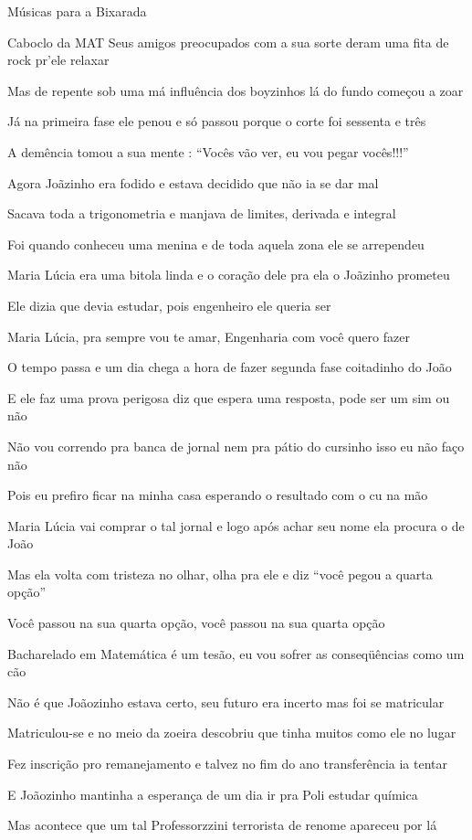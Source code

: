 \begin{secao}{Músicas para a Bixarada}
\begin{subsecao}{Caboclo da MAT}
Seus amigos preocupados com a sua sorte deram uma fita de rock pr'ele relaxar

Mas de repente sob uma má influência dos boyzinhos lá do fundo começou a zoar

Já na primeira fase ele penou e só passou porque o corte foi sessenta e três

A demência tomou a sua mente : ``Vocês vão ver, eu vou pegar vocês!!!''

Agora Joãzinho era fodido e estava decidido que não ia se dar mal

Sacava toda a trigonometria e manjava de limites, derivada e integral

Foi quando conheceu uma menina e de toda aquela zona ele se arrependeu

Maria Lúcia era uma bitola linda e o coração dele pra ela o Joãzinho prometeu

Ele dizia que devia estudar, pois engenheiro ele queria ser

Maria Lúcia, pra sempre vou te amar, Engenharia com você quero fazer

O tempo passa e um dia chega a hora de fazer segunda fase coitadinho do João

E ele faz uma prova perigosa diz que espera uma resposta, pode ser um sim ou não

Não vou correndo pra banca de jornal nem pra pátio do cursinho isso eu não faço
não

Pois eu prefiro ficar na minha casa esperando o resultado com o cu na mão

Maria Lúcia vai comprar o tal jornal e logo após achar seu nome ela procura o de
João

Mas ela volta com tristeza no olhar, olha pra ele e diz ``você pegou a quarta
opção''

Você passou na sua quarta opção, você passou na sua quarta opção

Bacharelado em Matemática é um tesão, eu vou sofrer as conseqüências como um cão

Não é que Joãozinho estava certo, seu futuro era incerto mas foi se matricular

Matriculou-se e no meio da zoeira descobriu que tinha muitos como ele no lugar

Fez inscrição pro remanejamento e talvez no fim do ano transferência ia tentar

E Joãozinho mantinha a esperança de um dia ir pra Poli estudar química

Mas acontece que um tal Professorzzini terrorista de renome apareceu por lá


\end{subsecao}
\end{secao}
